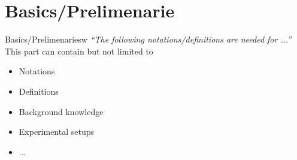 \documentclass[english,169,helvet]{ICEbeamerTUMCD}
\begin{document}
\section{Basics/Prelimenarie}
\begin{frame}{Basics/Prelimenariesw}
  \textit{``The following notations/definitions are needed for ...'' }\\
  This part can contain but not limited to
  \begin{itemize}
  \item Notations
  \item Definitions
  \item Background knowledge
  \item Experimental setups
  \item ... 
  \end{itemize}
\end{frame}
\end{document}
